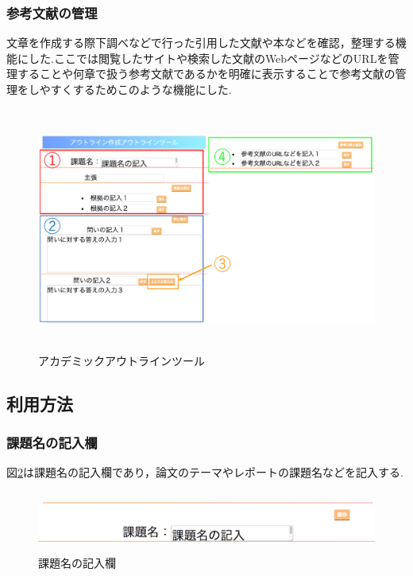 \documentclass[a4j,12pt]{jarticle}
\begin{document}
\subsubsection{参考文献の管理}
文章を作成する際下調べなどで行った引用した文献や本などを確認，整理する機能にした.ここでは閲覧したサイトや検索した文献のWebページなどのURLを管理することや何章で扱う参考文献であるかを明確に表示することで参考文献の管理をしやすくするためこのような機能にした.
\begin{figure}[h]
\begin{center}
 \includegraphics[clip,width=150mm,height=80mm]{pp01.pdf}
\end{center}
 \caption{アカデミックアウトラインツール}
 \label{fig:g}
\end{figure}

\newpage

\subsection{利用方法}
\subsubsection{課題名の記入欄}
図\ref{fig:h}は課題名の記入欄であり，論文のテーマやレポートの課題名などを記入する.
\begin{figure}[h]
\begin{center}
 \includegraphics[clip,width=150mm,height=20mm]{00kadai.png}
\end{center}
 \caption{課題名の記入欄}
 \label{fig:h}
\end{figure}
\end{document}
